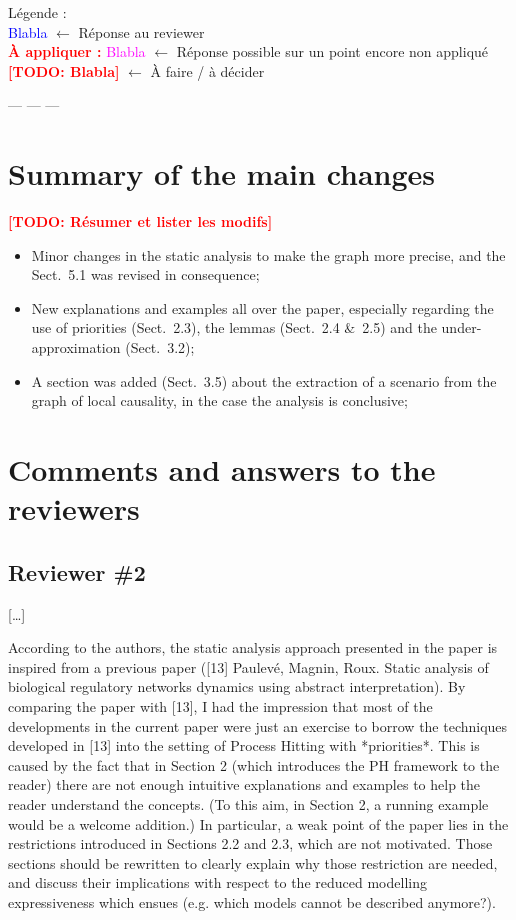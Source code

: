 \documentclass[11pt]{article}
\newcommand{\todo}[1]{\textcolor{red}{\textbf{[TODO: #1]}}}
\newcommand{\answertodo}[1]{\textcolor{red}{\textbf{À appliquer :}} \textcolor{magenta}{#1}}
\newcommand{\answer}[1]{\textcolor{blue}{#1}}
\begin{document}
\noindent
Légende :\\
\answer{Blabla} $\longleftarrow$ Réponse au reviewer\\
\answertodo{Blabla} $\longleftarrow$ Réponse possible sur un point encore non appliqué\\
\todo{Blabla} $\longleftarrow$ À faire / à décider

\begin{center}
  --- --- ---
\end{center}



\section*{Summary of the main changes}

\todo{Résumer et lister les modifs}

\begin{itemize}
  \item Minor changes in the static analysis to make the graph more precise,
    and the Sect.~5.1 was revised in consequence;
  \item New explanations and examples all over the paper,
    especially regarding the use of priorities (Sect.~2.3),
    the lemmas (Sect.~2.4 \&~2.5)
    and the under-approximation (Sect.~3.2);
  \item A section was added (Sect.~3.5) about the extraction of a scenario from the graph of
    local causality, in the case the analysis is conclusive;
\end{itemize}



\section*{Comments and answers to the reviewers}

\subsection*{Reviewer \#2}

[…]

According to the authors, the static analysis approach presented in the paper is inspired from a previous paper ([13] Paulevé, Magnin, Roux. Static analysis of biological regulatory networks dynamics using abstract interpretation). By comparing the paper with [13], I had the impression that most of the developments in the current paper were just an exercise to borrow the techniques developed in [13] into the setting of Process Hitting with *priorities*. This is caused by the fact that in Section 2 (which introduces the PH framework to the reader) there are not enough intuitive explanations and examples to help the reader understand the concepts. (To this aim, in Section 2, a running example would be a welcome addition.)
In particular, a weak point of the paper lies in the restrictions introduced in Sections 2.2 and 2.3, which are not motivated. Those sections should be rewritten to clearly explain why those restriction are needed, and discuss their implications with respect to the reduced modelling expressiveness which ensues (e.g. which models cannot be described anymore?).
\end{document}
